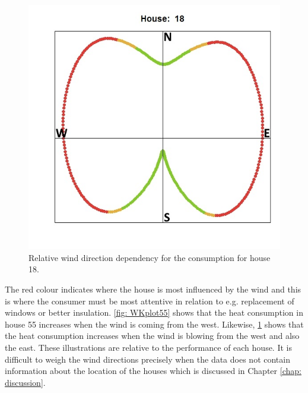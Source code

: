 \begin{figure}
    \centering
    \includegraphics[width=.8\textwidth]{../../../figures/WKplot18.jpeg}
    \caption{Relative wind direction dependency for the consumption for house 18.}
    \label{fig: WKplot18}
\end{figure}
The red colour indicates where the house is most influenced by the wind and this is where the consumer must be most attentive in relation to e.g. replacement of windows or better insulation. \cref{fig: WKplot55} shows that the heat consumption in house 55 increases when the wind is coming from the west. Likewise, \cref{fig: WKplot18} shows that the heat consumption increases when the wind is blowing from the west and also the east. These illustrations are relative to the performance of each house. It is difficult to weigh the wind directions precisely when the data does not contain information about the location of the houses which is discussed in Chapter \ref{chap: discussion}. 
